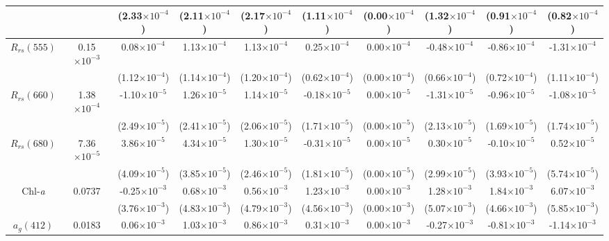 \documentclass[preview]{standalone}
\begin{document}
\begin{threeparttable}
\begin{tabular}{cccccccccc}
			  &						&	 (2.33$\times10^{-4}$)	&   (2.11$\times10^{-4}$) 	&   (2.17$\times10^{-4}$) 	&   (1.11$\times10^{-4}$) 	&   (0.00$\times10^{-4}$) 	&   (1.32$\times10^{-4}$) 	&   (0.91$\times10^{-4}$) 	&   (0.82$\times10^{-4}$) 	\\ \hline
$R_{rs}(555)$ & 0.15$\times10^{-3}$	&	  0.08$\times10^{-4}$  	&    1.13$\times10^{-4}$  	&    1.13$\times10^{-4}$  	&    0.25$\times10^{-4}$  	&    0.00$\times10^{-4}$  	&   -0.48$\times10^{-4}$  	&   -0.86$\times10^{-4}$  	&   -1.31$\times10^{-4}$ 	\\
			  &						&	 (1.12$\times10^{-4}$)	&   (1.14$\times10^{-4}$) 	&   (1.20$\times10^{-4}$) 	&   (0.62$\times10^{-4}$) 	&   (0.00$\times10^{-4}$) 	&   (0.66$\times10^{-4}$) 	&   (0.72$\times10^{-4}$) 	&   (1.11$\times10^{-4}$) 	\\ \hline
$R_{rs}(660)$ & 1.38$\times10^{-4}$	&	 -1.10$\times10^{-5}$ 	&    1.26$\times10^{-5}$ 	&    1.14$\times10^{-5}$ 	&   -0.18$\times10^{-5}$ 	&    0.00$\times10^{-5}$ 	&   -1.31$\times10^{-5}$ 	&   -0.96$\times10^{-5}$ 	&   -1.08$\times10^{-5}$ 	\\
			  &						&	 (2.49$\times10^{-5}$) 	&   (2.41$\times10^{-5}$) 	&   (2.06$\times10^{-5}$) 	&   (1.71$\times10^{-5}$) 	&   (0.00$\times10^{-5}$) 	&   (2.13$\times10^{-5}$) 	&   (1.69$\times10^{-5}$) 	&   (1.74$\times10^{-5}$) 	\\ \hline
$R_{rs}(680)$ & 7.36$\times10^{-5}$	&	  3.86$\times10^{-5}$ 	&    4.34$\times10^{-5}$ 	&    1.30$\times10^{-5}$ 	&   -0.31$\times10^{-5}$ 	&    0.00$\times10^{-5}$ 	&    0.30$\times10^{-5}$ 	&   -0.10$\times10^{-5}$ 	&    0.52$\times10^{-5}$ 	\\
			  &						&	 (4.09$\times10^{-5}$)	&   (3.85$\times10^{-5}$) 	&   (2.46$\times10^{-5}$) 	&   (1.81$\times10^{-5}$) 	&   (0.00$\times10^{-5}$) 	&   (2.99$\times10^{-5}$) 	&   (3.93$\times10^{-5}$) 	&   (5.74$\times10^{-5}$) 	\\ \hline
Chl-\it{a}    &  0.0737 			&	 -0.25$\times10^{-3}$ 	&    0.68$\times10^{-3}$ 	&    0.56$\times10^{-3}$ 	&    1.23$\times10^{-3}$ 	&    0.00$\times10^{-3}$ 	&    1.28$\times10^{-3}$ 	&    1.84$\times10^{-3}$ 	&    6.07$\times10^{-3}$ 	\\ 
	  		  &						&	 (3.76$\times10^{-3}$)	&   (4.83$\times10^{-3}$) 	&   (4.79$\times10^{-3}$) 	&   (4.56$\times10^{-3}$) 	&   (0.00$\times10^{-3}$) 	&   (5.07$\times10^{-3}$) 	&   (4.66$\times10^{-3}$) 	&   (5.85$\times10^{-3}$) 	\\ \hline
$a_{g}(412)$  &  0.0183 			&	  0.06$\times10^{-3}$ 	&    1.03$\times10^{-3}$ 	&    0.86$\times10^{-3}$ 	&    0.31$\times10^{-3}$ 	&    0.00$\times10^{-3}$ 	&   -0.27$\times10^{-3}$ 	&   -0.81$\times10^{-3}$ 	&   -1.14$\times10^{-3}$ 	\\ 

\end{tabular}
\end{threeparttable}
\end{document}
